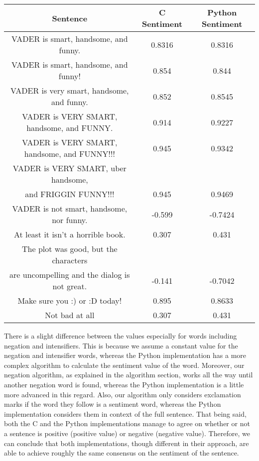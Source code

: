 \documentclass[12pt]{article}
\begin{document}
\begin{center}
	\begin{tabular}{ |c|c|c| }
		\hline
		\textbf{Sentence} & \textbf{C Sentiment} & \textbf{Python Sentiment} \\
		\hline
		VADER is smart, handsome, and funny. & 0.8316 & 0.8316 \\
		VADER is smart, handsome, and funny! & 0.854 & 0.844 \\
		VADER is very smart, handsome, and funny. & 0.852 & 0.8545 \\
		VADER is VERY SMART, handsome, and FUNNY. & 0.914 & 0.9227 \\
		VADER is VERY SMART, handsome, and FUNNY!!! & 0.945 & 0.9342 \\
		VADER is VERY SMART, uber handsome, \\ and FRIGGIN FUNNY!!! & 0.945 & 0.9469 \\
		VADER is not smart, handsome, nor funny. & -0.599 & -0.7424 \\
		At least it isn't a horrible book. & 0.307 & 0.431 \\
		The plot was good, but the characters \\ are uncompelling and the dialog is not great. & -0.141 & -0.7042 \\
		Make sure you :) or :D today! & 0.895 & 0.8633 \\
		Not bad at all & 0.307 & 0.431 \\
		\hline
	\end{tabular}
\end{center}

There is a slight difference between the values especially for words including negation and intensifiers.
This is because we assume a constant value for the negation and intensifier words, whereas the Python implementation has a more complex algorithm to calculate the sentiment value of the word.
Moreover, our negation algorithm, as explained in the algorithm section, works all the way until another negation word is found, whereas the Python implementation is a little more advanced in this regard.
Also, our algorithm only considers exclamation marks if the word they follow is a sentiment word, whereas the Python implementation considers them in context of the full sentence.
That being said, both the C and the Python implementations manage to agree on whether or not a sentence is positive (positive value) or negative (negative value).
Therefore, we can conclude that both implementations, though different in their approach, are able to achieve roughly the same consensus on the sentiment of the sentence.
\end{document}
